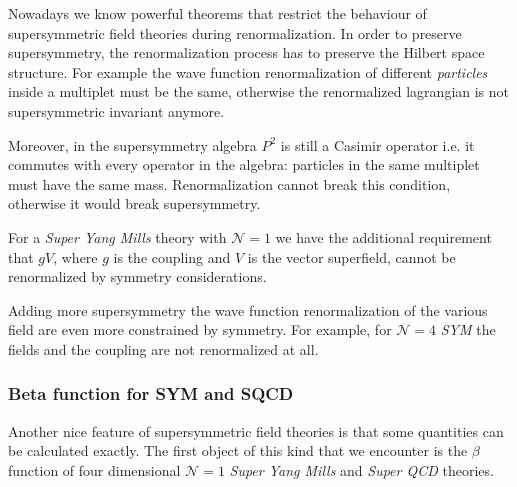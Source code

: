 Nowadays we know powerful theorems that restrict the behaviour of supersymmetric field theories during renormalization.
In order to preserve supersymmetry, the renormalization process has to preserve the Hilbert space structure. For example the wave function renormalization of different \emph{particles} inside a multiplet must be the same, otherwise the renormalized lagrangian is not supersymmetric invariant anymore. 

Moreover, in the supersymmetry algebra $P^2$ is still a Casimir operator i.e. it commutes with every operator in the algebra: particles in the same multiplet must have the same mass.
Renormalization cannot break this condition, otherwise it would break supersymmetry.

For a \emph{Super Yang Mills} theory with $\mathcal{N} = 1$ we have the additional requirement that $g V$, where $g$ is the coupling and $V$ is the vector superfield, cannot be renormalized by symmetry considerations. 

Adding more supersymmetry the wave function renormalization of the various field are even more constrained by symmetry.
For example, for $\mathcal{N}=4$ \emph{SYM} the fields and the coupling are not renormalized at all.








\subsubsection{Beta function for SYM and SQCD}
Another nice feature of supersymmetric field theories is that some quantities can be calculated exactly.
The first object of this kind that we encounter is the $\beta$ function of four dimensional $\mathcal{N} =  1 $ \emph{Super Yang Mills} and \emph{Super QCD} theories.

